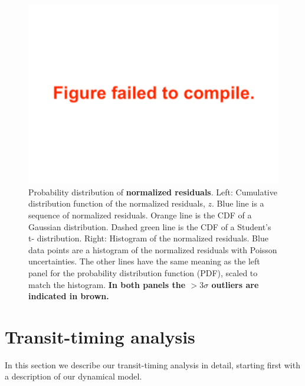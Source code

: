 \documentclass[twocolumn]{aastex63}
\begin{document}
\begin{figure}
    \centering
    \includegraphics[width=\hsize]{figures/Students_t_optimized.pdf}
    {Probability distribution of \textbf{normalized residuals}.  Left:  Cumulative distribution
        function of the normalized residuals, $z$.  Blue line is a sequence of normalized residuals.
        Orange line is the CDF of a Gaussian distribution. %
        Dashed green line is the CDF of a Student's t-
        distribution.  Right: Histogram of the normalized residuals.  Blue data points
        are a histogram of the normalized residuals with Poisson uncertainties.  The other lines
        have the same meaning as the left panel for the probability distribution function
        (PDF),  scaled to match the histogram. \textbf{In both panels the $>3\sigma$ outliers are indicated
        in brown.}}
    \label{fig:timing_residuals}
\end{figure}

\section{Transit-timing analysis} \label{sec:transit_timing}

In this section we describe our transit-timing analysis in detail, starting first with a description of our dynamical model.



\end{document}
